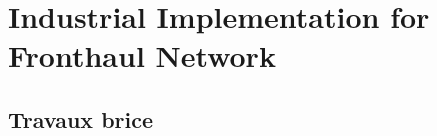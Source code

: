 
\chapter{Industrial Implementation for Fronthaul Network}
\label{chap:TSN}
\minitoc



\section{Travaux brice}

